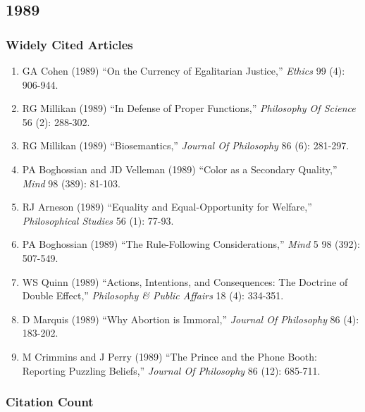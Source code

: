 \documentclass[
  10pt,
  letterpaper,
  DIV=11,
  numbers=noendperiod,
  twoside]{scrartcl}
\providecommand{\tightlist}{%
  \setlength{\itemsep}{0pt}\setlength{\parskip}{0pt}}\usepackage{longtable,booktabs,array}
\begin{document}
\newpage

\subsection{1989}\label{sec-s1989}

\subsubsection*{Widely Cited Articles}\label{widely-cited-articles-33}

\begin{enumerate}
\def\labelenumi{\arabic{enumi}.}
\tightlist
\item
  GA Cohen (1989) ``On the Currency of Egalitarian Justice,''
  \emph{Ethics} 99 (4): 906-944.
\item
  RG Millikan (1989) ``In Defense of Proper Functions,''
  \emph{Philosophy Of Science} 56 (2): 288-302.
\item
  RG Millikan (1989) ``Biosemantics,'' \emph{Journal Of Philosophy} 86
  (6): 281-297.
\item
  PA Boghossian and JD Velleman (1989) ``Color as a Secondary Quality,''
  \emph{Mind} 98 (389): 81-103.
\item
  RJ Arneson (1989) ``Equality and Equal-Opportunity for Welfare,''
  \emph{Philosophical Studies} 56 (1): 77-93.
\item
  PA Boghossian (1989) ``The Rule-Following Considerations,''
  \emph{Mind} 5 98 (392): 507-549.
\item
  WS Quinn (1989) ``Actions, Intentions, and Consequences: The Doctrine
  of Double Effect,'' \emph{Philosophy \& Public Affairs} 18 (4):
  334-351.
\item
  D Marquis (1989) ``Why Abortion is Immoral,'' \emph{Journal Of
  Philosophy} 86 (4): 183-202.
\item
  M Crimmins and J Perry (1989) ``The Prince and the Phone Booth:
  Reporting Puzzling Beliefs,'' \emph{Journal Of Philosophy} 86 (12):
  685-711.
\end{enumerate}

\subsubsection*{Citation Count}\label{sec-count-1989}
\end{document}
